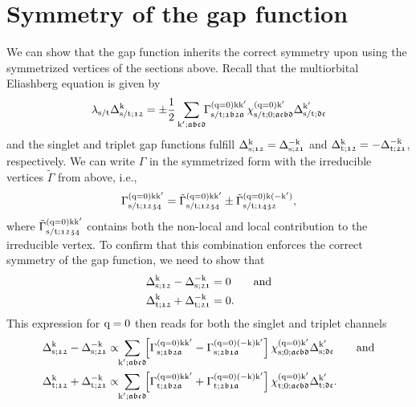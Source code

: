 \documentclass[main.tex]{subfiles}
\begin{document}
\section{Symmetry of the gap function}

We can show that the gap function inherits the correct symmetry upon using the symmetrized vertices of the sections above. Recall that the multiorbital Eliashberg equation is given by 
\begin{align}
	\lambda_{\text{s}/\text{t}}\Delta_{\text{s}/\text{t};\mathfrak{12}}^{\text{k}}=\pm\frac{1}{2}\sum_{\text{k}';\mathfrak{abcd}}\!\!\Gamma^{(\text{q}=0)\text{k}\text{k}'}_{\text{s}/\text{t};\mathfrak{1b2a}}\chi^{(\text{q}=0)\text{k}'}_{\text{s}/\text{t};0;\mathfrak{acbd}}\Delta_{\text{s}/\text{t};\mathfrak{dc}}^{\text{k}'}
\end{align}
and the singlet and triplet gap functions fulfill $\Delta_{\text{s};\mathfrak{12}}^{\text{k}}=\Delta_{\text{s};\mathfrak{21}}^{-\text{k}}$ and $\Delta_{\text{t};\mathfrak{12}}^{\text{k}}=-\Delta_{\text{t};\mathfrak{21}}^{-\text{k}}$, respectively. 
We can write $\Gamma$ in the symmetrized form with the irreducible vertices $\tilde{\Gamma}$ from above, i.e.,
\begin{align}\label{eq:symmetrization_pairing_vertex}
	\Gamma^{(\text{q}=0)\text{k}\text{k}'}_{\text{s}/\text{t};\mathfrak{1234}} = \tilde{\Gamma}^{(\text{q}=0)\text{k}\text{k}'}_{\text{s}/\text{t};\mathfrak{1234}}\pm \tilde{\Gamma}^{(\text{q}=0)\text{k}(-\text{k}')}_{\text{s}/\text{t};\mathfrak{1432}},
\end{align}
where $\tilde{\Gamma}^{(\text{q}=0)\text{k}\text{k}'}_{\text{s}/\text{t};\mathfrak{1234}}$ contains both the non-local and local contribution to the irreducible vertex. To confirm that this combination enforces the correct symmetry of the gap function, we need to show that
\begin{subequations}
\begin{align}
	\Delta_{\text{s};\mathfrak{12}}^{\text{k}}-\Delta_{\text{s};\mathfrak{21}}^{-\text{k}}&=0\qquad\text{and}\\
	\Delta_{\text{t};\mathfrak{12}}^{\text{k}}+\Delta_{\text{t};\mathfrak{21}}^{-\text{k}}&=0.
\end{align}
\end{subequations}
This expression for $\text{q}=0$ then reads for both the singlet and triplet channels
\begin{subequations}
\begin{align}
	\Delta_{\sing;\mathfrak{12}}^{\k}-\Delta_{\sing;\mathfrak{21}}^{-\k}&\propto\!\!\sum_{\kp;\mathfrak{abcd}}\!\! \left [\Gamma^{(\q=0)\k\kp}_{\sing;\mathfrak{1b2a}}-\Gamma^{(\q=0)(-\k)\kp}_{\sing;\mathfrak{2b1a}}\right ]\chi^{(\q=0)\kp}_{\sing;0;\mathfrak{acbd}}\Delta_{\sing;\mathfrak{dc}}^{\kp}\label{eq:symmetrization_delta_first_formula_singlet}\qqand\\
	\Delta_{\trip;\mathfrak{12}}^{\k}+\Delta_{\trip;\mathfrak{21}}^{-\k}&\propto\!\!\sum_{\kp;\mathfrak{abcd}}\!\! \left [\Gamma^{(\q=0)\k\kp}_{\trip;\mathfrak{1b2a}}+\Gamma^{(\q=0)(-\k)\kp}_{\trip;\mathfrak{2b1a}}\right ]\chi^{(\q=0)\kp}_{\trip;0;\mathfrak{acbd}}\Delta_{\trip;\mathfrak{dc}}^{\kp}\label{eq:symmetrization_delta_first_formula_triplet}.
\end{align}
\end{subequations}
\end{document}
